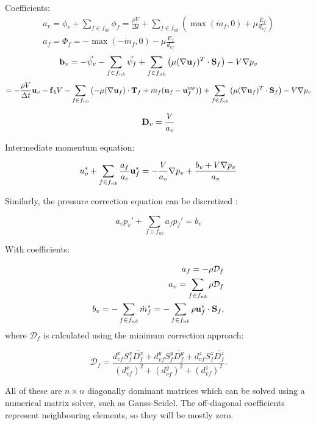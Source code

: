 \documentclass[12pt]{article}
\newcommand{\lb}{\left(}
\newcommand{\rb}{\right)}
\newcommand{\vb}[1]{\text{\textbf{#1}}}
\begin{document}
Coefficients:
\begin{align}
  a_v = \phi_v + \sum_{f \in f_{nb}} \phi_f = \frac{\rho V}{\Delta t} + \sum_{f \in f_{nb}} \lb \max(\dot m_f, 0) + \mu \frac{E_f}{d_{vf}} \rb \\
  a_f = \Phi_f = -\max(-\dot m_f, 0) - \mu \frac{E_f}{d_{vf}}
\end{align}
\begin{equation}
  \vb b_v = -\vec \psi_v - \sum_{f \in f_{nb}} \vec \psi_f + \sum_{f \in f_{nb}} \lb \mu (\nabla \vb u_f)^T \cdot \vb S_f \rb - V \nabla p_v
\end{equation}
$$
= - \frac{\rho V}{\Delta t} \vb u_v - \vb f_b V - \sum_{f \in f_{nb}} \lb - \mu (\nabla \vb u_f) \cdot \vb T_f + \dot m_f (\vb u_f - \vb u_f^{\text{uw}}) \rb + \sum_{f \in f_{nb}} \lb \mu (\nabla \vb u_f)^T \cdot \vb S_f \rb - V \nabla p_v
$$

$$
\vb D_v = \frac{V}{a_v}
$$

Intermediate momentum equation:

\begin{equation}
  u_v^* + \sum_{f \in f_{nb}} \frac{a_f}{a_c} \vb u_f^* = -\frac{V}{a_v} \nabla p_v + \frac{b_v + V \nabla p_v}{a_v}
\end{equation}

Similarly, the pressure correction equation can be discretized \cite{mou}:

\begin{equation}
  a_v p_v' + \sum_{f \in f_{nb}} a_f p_f' = b_v
\end{equation}

With coefficients:

\begin{align}
  a_f = -\rho \mathcal{D}_f \\
  a_v = \sum_{f \in f_{nb}} \rho \mathcal{D}_f\\
  b_v = - \sum_{f \in f_{nb}} \dot m_f^* = - \sum_{f \in f_{nb}} \rho \vb u_f^* \cdot \vb S_f,
\end{align}
where $\mathcal{D}_f$ is calculated using the minimum correction approach:

$$
\mathcal{D}_f = \frac{d_{vf}^x S_f^x \overline{D_f^x} + d_{vf}^y S_f^y \overline{D_f^y} + d_{vf}^z S_f^z \overline{D_f^z}}{(d_{vf}^x)^2 + (d_{vf}^y)^2 + (d_{vf}^z)^2}.
$$



All of these are $n \times n$ diagonally dominant matrices which can be solved using a numerical matrix solver, such as Gauss-Seidel. The off-diagonal coefficients represent neighbouring elements, so they will be mostly zero.
\end{document}
